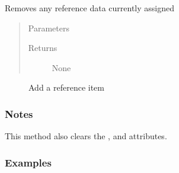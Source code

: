 \documentclass[letterpaper,10pt,english]{sphinxmanual}
\begin{document}
\begin{fulllineitems}
\label{\detokenize{generated/seg1d.Segmenter.clear_reference:seg1d.Segmenter.clear_reference}}
\sphinxAtStartPar
Removes any reference data currently assigned
\begin{quote}\begin{description}
\item[{Parameters}] \leavevmode\begin{description}
\item[{}] \leavevmode
\end{description}

\item[{Returns}] \leavevmode\begin{description}
\item[{None}] \leavevmode
\end{description}

\end{description}\end{quote}


\nopagebreak

\begin{description}
\item[{{\hyperref[\detokenize{generated/seg1d.Segmenter.add_reference:seg1d.Segmenter.add_reference}]{}}}] \leavevmode
\sphinxAtStartPar
Add a reference item

\end{description}


\subsubsection*{Notes}

\sphinxAtStartPar
This method also clears the , and  attributes.
\subsubsection*{Examples}


\end{fulllineitems}
\end{document}
